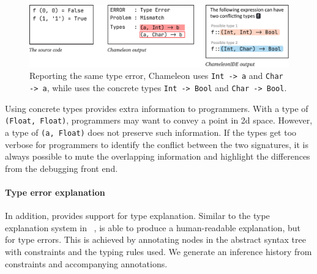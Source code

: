 \begin{figure}
    \centering
    \includegraphics[width=\linewidth, trim=0mm 6mm 0mm 0mm]{images/compare-to-original.pdf}
    \caption{
Reporting the same type error, Chameleon uses
\texttt{Int -> a} and \texttt{Char -> a}, while \chameleon{} uses the 
concrete types \texttt{Int -> Bool} and \texttt{Char -> Bool}.
    }
    \label{fig:compare-to-original}
\end{figure}

Using concrete types provides extra information to programmers. With a type of \texttt{(Float, Float)}, programmers may want to convey a point in 2d space. However, a type of \texttt{(a, Float)} does not preserve such information. If the types get too verbose for programmers to identify the conflict between the two signatures, it is always possible to mute the overlapping information and highlight the differences from the debugging front end.


\paragraph{Type error explanation}

In addition, \chameleon{} provides support for type explanation. Similar to the type explanation system  in ~\cite{jun_explaining_2002},  \chameleon{} is able to produce a human-readable explanation, but for type errors. This is achieved by annotating nodes in the abstract syntax tree with constraints and the typing rules used. We generate an inference history from constraints and accompanying annotations. 


